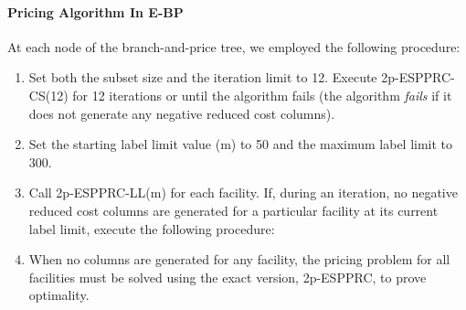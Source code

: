 \documentclass[11pt]{article}
\begin{document}
\paragraph{Pricing Algorithm In E-BP}
 At each node of the branch-and-price tree, we employed the following procedure:
\begin{enumerate}
\item Set both the subset size and the iteration limit to 12. Execute 2p-ESPPRC-CS(12) for 
12 iterations or until the algorithm fails (the algorithm {\it fails} if it does not 
generate any negative reduced cost columns).
\item Set the starting label limit value (m) to 50 and the maximum label limit
to 300.  
\item Call 2p-ESPPRC-LL(m) for each facility. If, during an iteration, no negative reduced 
cost columns are generated for a particular facility at its current label limit, 
execute the following procedure:
\item  When no columns are generated for any facility, the pricing problem for all facilities 
must be solved using the exact version, 2p-ESPPRC, to prove optimality.
\end{enumerate}
\end{document}
